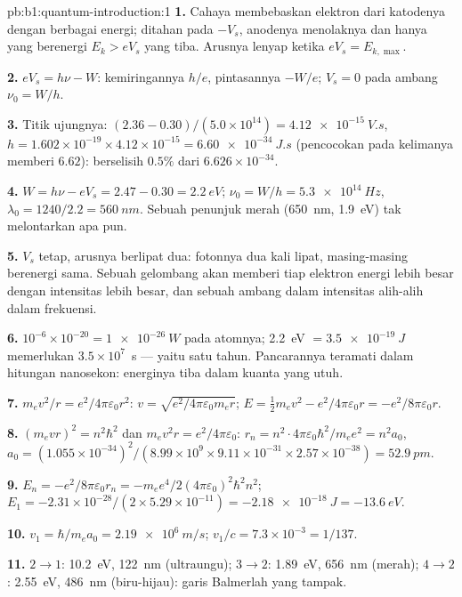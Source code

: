 \begin{solution}{pb:b1:quantum-introduction:1}
\textbf{1.} Cahaya membebaskan elektron dari katodenya dengan berbagai
energi; ditahan pada $-V_s$, anodenya menolaknya dan hanya yang berenergi
$E_k > eV_s$ yang tiba. Arusnya lenyap ketika $eV_s = E_{k,\max}$.

\textbf{2.} $eV_s = h\nu - W$: kemiringannya $h/e$, pintasannya $-W/e$; $V_s = 0$ pada
ambang $\nu_0 = W/h$.

\textbf{3.} Titik ujungnya: $(2.36 - 0.30)/(5.0 \times 10^{14}) = \qty{4.12e-15}{V.s}$,
$h = 1.602 \times 10^{-19} \times 4.12 \times 10^{-15} = \qty{6.60e-34}{J.s}$ (pencocokan pada
kelimanya memberi $6.62$): berselisih $0.5\%$ dari $6.626 \times 10^{-34}$.

\textbf{4.} $W = h\nu - eV_s = 2.47 - 0.30 = \qty{2.2}{eV}$; $\nu_0 = W/h =
\qty{5.3e14}{Hz}$, $\lambda_0 = 1240/2.2 = \qty{560}{nm}$. Sebuah penunjuk merah
(\qty{650}{nm}, \qty{1.9}{eV}) tak melontarkan apa pun.

\textbf{5.} $V_s$ tetap, arusnya berlipat dua: fotonnya dua kali lipat, masing-masing
berenergi sama. Sebuah gelombang akan memberi tiap elektron energi lebih besar dengan
intensitas lebih besar, dan sebuah ambang dalam intensitas alih-alih dalam frekuensi.

\textbf{6.} $10^{-6} \times 10^{-20} = \qty{1e-26}{W}$ pada atomnya; \qty{2.2}{eV} $=
\qty{3.5e-19}{J}$ memerlukan $3.5 \times 10^7$~s --- yaitu satu tahun. Pancarannya teramati
dalam hitungan nanosekon: energinya tiba dalam kuanta yang utuh.

\textbf{7.} $m_ev^2/r = e^2/4\pi\varepsilon_0r^2$: $v = \sqrt{e^2/4\pi\varepsilon_0m_er}$; $E =
\tfrac12m_ev^2 - e^2/4\pi\varepsilon_0r = -e^2/8\pi\varepsilon_0r$.

\textbf{8.} $(m_evr)^2 = n^2\hbar^2$ dan $m_ev^2r = e^2/4\pi\varepsilon_0$: $r_n = n^2 \cdot
4\pi\varepsilon_0\hbar^2/m_ee^2 = n^2a_0$, $a_0 = (1.055 \times 10^{-34})^2/(8.99 \times 10^9
\times 9.11 \times 10^{-31} \times 2.57 \times 10^{-38}) = \qty{52.9}{pm}$.

\textbf{9.} $E_n = -e^2/8\pi\varepsilon_0r_n = -m_ee^4/2(4\pi\varepsilon_0)^2\hbar^2n^2$; $E_1 =
-2.31 \times 10^{-28}/(2 \times 5.29 \times 10^{-11}) = \qty{-2.18e-18}{J} = \qty{-13.6}{eV}$.

\textbf{10.} $v_1 = \hbar/m_ea_0 = \qty{2.19e6}{m/s}$; $v_1/c = 7.3 \times 10^{-3} =
1/137$.

\textbf{11.} $2 \to 1$: \qty{10.2}{eV}, \qty{122}{nm} (ultraungu); $3 \to 2$:
\qty{1.89}{eV}, \qty{656}{nm} (merah); $4 \to 2$: \qty{2.55}{eV}, \qty{486}{nm}
(biru-hijau): garis Balmerlah yang tampak.


\end{solution}
